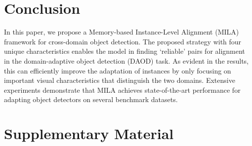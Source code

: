 \documentclass{bmvc2k}
\begin{document}
\section{Conclusion}
In this paper, we propose a Memory-based Instance-Level Alignment (MILA) framework for cross-domain object detection. 
The proposed strategy with four unique characteristics enables the model in finding ‘reliable’ pairs for alignment in the domain-adaptive object detection (DAOD) task. As evident in the results, this can efficiently improve the adaptation of instances by only focusing on important visual characteristics that distinguish the two domains. Extensive experiments demonstrate that MILA achieves state-of-the-art performance for adapting object detectors on several benchmark datasets.






\section{Supplementary Material}

\end{document}
